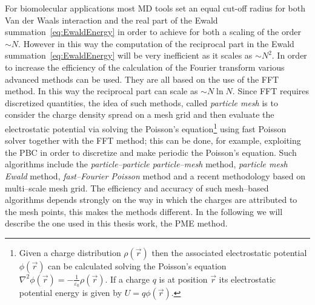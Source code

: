 For biomolecular applications most \ac{MD} tools set an equal cut-off radius for both Van der Waals interaction
and the real part of the Ewald summation~\eqref{eq:EwaldEnergy} in order to achieve for both a scaling of the
order $\sim N$. However in this way the computation of the reciprocal part in the Ewald
summation~\eqref{eq:EwaldEnergy} will be very inefficient as it scales as $\sim N^2$. In order to increase the
efficiency of the calculation of the Fourier transform various advanced methods can be used. They are all based
on the use of the \ac{FFT} method. In this way the reciprocal part can scale as $\sim N\ln N$. Since \ac{FFT}
requires discretized quantities, the idea of such methods, called \textit{particle mesh} is to consider the
charge density spread on a mesh grid and then evaluate the electrostatic potential via solving the Poisson's
equation\footnote{Given a charge distribution $\rho(\vec r)$ then the associated electrostatic potential
$\phi(\vec r)$ can be calculated solving the Poisson's equation $\displaystyle \nabla^2\phi(\vec r) = -\frac{1}{\varepsilon_0} \rho(\vec r)$. If a charge $q$ is at position $\vec r$ its electrostatic potential energy is given by $U = q\phi(\vec r)$.}
using fast Poisson solver together with the \ac{FFT} method; this can be done, for example, exploiting the
\ac{PBC} in order to discretize and make periodic the Poisson's equation.
Such algorithms include the \textit{particle--particle particle--mesh} method, \textit{particle mesh Ewald}
method, \textit{fast--Fourier Poisson} method and a recent methodology based on multi--scale mesh grid. The
efficiency and accuracy of such mesh--based algorithms depends strongly on the way in which the charges are
attributed to the mesh points, this makes the methods different. In the following we will describe the one used
in this thesis work, the \acf{PME} method.


